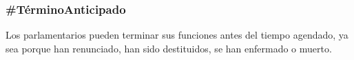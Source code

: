 \subsubsection{\#TérminoAnticipado}

Los parlamentarios pueden terminar sus funciones antes del tiempo
agendado, ya sea porque han renunciado, han sido destituidos, se han
enfermado o muerto.

\begin{description}
  
\end{description}

